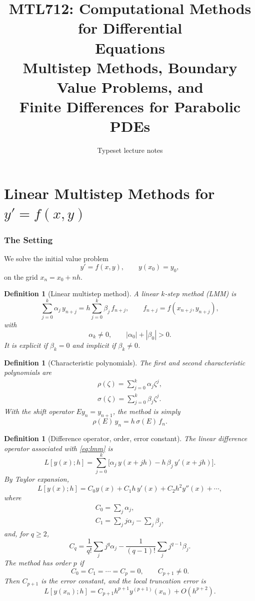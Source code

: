 \documentclass[11pt,a4paper]{article}
\title{\textbf{MTL712: Computational Methods for Differential\\Equations}\\[6pt]
\large Multistep Methods, Boundary Value Problems, and\\
Finite Differences for Parabolic PDEs}
\author{\normalsize Typeset lecture notes}
\date{}
\numberwithin{equation}{section}
\theoremstyle{spacedplain}
\theoremstyle{spaceddefinition}
\newtheorem{definition}[theorem]{Definition}
\theoremstyle{spacedremark}
\begin{document}
\maketitle
\thispagestyle{plain}
{\linespread{1.0}\selectfont\setlength{\parskip}{0pt}\tableofcontents}
\clearpage

\part{Linear Multistep Methods for \(y'=f(x,y)\)}

\section{The Setting}

We solve the initial value problem
\[
  y'=f(x,y),\qquad y(x_0)=y_0,
\]
on the grid \(x_n=x_0+nh\).

\begin{definition}[Linear multistep method]
A \emph{linear \(k\)-step method} (LMM) is
\begin{equation}\label{eq:lmm}
  \sum_{j=0}^k\alpha_j\,y_{n+j}
  =h\sum_{j=0}^k\beta_j\,f_{n+j},
  \qquad f_{n+j}=f(x_{n+j},y_{n+j}),
\end{equation}
with
\[
  \alpha_k\ne0,\qquad |\alpha_0|+|\beta_0|>0.
\]
It is \emph{explicit} if \(\beta_k=0\) and \emph{implicit} if
\(\beta_k\neq 0\).
\end{definition}

\begin{definition}[Characteristic polynomials]
The first and second characteristic polynomials are
\[
\begin{gathered}
  \rho(\zeta)=\sum_{j=0}^k\alpha_j\zeta^j,
  \\
  \sigma(\zeta)=\sum_{j=0}^k\beta_j\zeta^j.
\end{gathered}
\]
With the shift operator \(Ey_n=y_{n+1}\), the method is simply
\[
  \rho(E)\,y_n=h\,\sigma(E)\,f_n.
\]
\end{definition}

\begin{definition}[Difference operator, order, error constant]
The linear difference operator associated with \eqref{eq:lmm} is
\[
  L[y(x);h]
  =\sum_{j=0}^k\bigl[\alpha_j\,y(x+jh)-h\,\beta_j\,y'(x+jh)\bigr].
\]
By Taylor expansion,
\[
  L[y(x);h]=C_0y(x)+C_1h\,y'(x)+C_2h^2y''(x)+\cdots,
\]
where
\[
\begin{gathered}
  C_0=\sum_{j}\alpha_j,
  \\
  C_1=\sum_{j} j\alpha_j-\sum_{j}\beta_j,
\end{gathered}
\]
and, for \(q\ge2\),
\[
  C_q=\frac1{q!}\sum_{j} j^q\alpha_j
      -\frac1{(q-1)!}\sum_{j} j^{q-1}\beta_j .
\]
The method has \emph{order \(p\)} if
\[
  C_0=C_1=\cdots=C_p=0,
  \qquad C_{p+1}\ne0.
\]
Then \(C_{p+1}\) is the \emph{error constant}, and the local
truncation error is
\[
  L[y(x_n);h]=C_{p+1}h^{p+1}y^{(p+1)}(x_n)+O(h^{p+2}).
\]
\end{definition}
\end{document}
